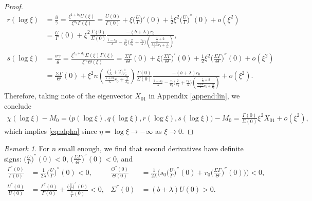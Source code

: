 \documentclass[usletter,11pt]{article}
\def\bg{{\bar{\gamma}}}
\def\bth{{\bar{\theta}}}
\def\bs{{\bar{\sigma}}}
\def\bu{{\bar{u}}}
\theoremstyle{remark}
\newtheorem{remark}{Remark}[section]
\begin{document}
\begin{proof}
\begin{align*}
 r(\log\xi) &= \frac{\bu}{ \bg } = \frac{ \xi^{1+b_1}U(\xi) }{ \xi^{a_1}\Gamma(\xi) } = \frac{ U(0) }{ \Gamma(0) }+ \xi \Big(\frac{U}{\Gamma}\Big)'(0) + \frac{1}{2}\xi^2\Big(\frac{U}{\Gamma}\Big)^{''}(0) + o(\xi^2)\\
  &=\frac{ U }{ \Gamma }(0) + \xi^2\frac{\Gamma(0)}{\Sigma(0)} \frac{-(b+\lambda)r_0}{\frac{1-s_0}{\lambda}-\frac{n}{r_0}\Big(\frac{2}{s_0} + \frac{r_0}{\lambda}\Big)\left(\frac{ \frac{1}{\lambda}+2}{ \frac{1+\alpha}{\lambda}r_0 + \frac{2}{s_0}}\right)} ,
  \\
 s(\log\xi) &= \frac{\bs\bg}{\bth} = \frac{ \xi^{a_1+d_1}\Sigma(\xi)\Gamma(\xi) }{\xi^{c_1} \Theta(\xi)} = \frac{ \Sigma\Gamma }{\Theta}(0) + \xi \Big(\frac{ \Sigma\Gamma }{\Theta}\Big)^{'}(0) + \frac{1}{2}\xi^2\Big(\frac{ \Sigma\Gamma }{\Theta}\Big)^{''}(0) + o(\xi^2)\\
 &=\frac{ \Sigma\Gamma }{\Theta}(0) + \xi^2 n \left(\frac{ \big(\frac{1}{\lambda}+2\big) \frac{1}{r_0} }{ \frac{1+\alpha}{\lambda}r_0 + \frac{2}{s_0}}\right)\frac{\Gamma(0)}{\Sigma(0)} \frac{-(b+\lambda)r_0}{\frac{1-s_0}{\lambda}-\frac{n}{r_0}\Big(\frac{2}{s_0} + \frac{r_0}{\lambda}\Big)\left(\frac{ \frac{1}{\lambda}+2}{ \frac{1+\alpha}{\lambda}r_0 + \frac{2}{s_0}}\right)}+ o(\xi^2).
\end{align*}
Therefore, taking note of the eigenvector $X_{01}$ in Appendix \ref{append:lin}, we conclude
\begin{align*}
\chi(\log\xi)-M_0  = \big(p(\log\xi),q(\log\xi),r(\log\xi),s(\log\xi)\big) -M_0 =  \frac{\Gamma(0)}{\Sigma(0)}\xi^2 X_{01} + o(\xi^2),
\end{align*}
which implies \eqref{eq:alpha} since $\eta=\log\xi \to -\infty$ as $\xi \to 0$.
\end{proof}
\begin{remark} \label{rem:signs}
For $n$ small enough, we find that second derivatives have definite signs: $\displaystyle \Big(\frac{U}{\Gamma}\Big)^{''}(0) <0$, $\displaystyle \Big(\frac{\Sigma\Gamma}{\Theta}\Big)^{''}(0) <0$, and
\begin{equation} \label{eq:second_der}
\begin{aligned}
\frac{\Gamma^{''}(0)}{\Gamma(0)} &= \frac{1}{2\lambda}\Big(\frac{U}{\Gamma}\Big)^{''}(0) < 0, &
\frac{\Theta^{''}(0)}{\Theta(0)} &= \frac{1}{2\lambda}\Big(s_0\Big(\frac{U}{\Gamma}\Big)^{''}(0) + r_0\Big(\frac{\Sigma\Gamma}{\Theta}\Big)^{''}(0)\Big)\Big)  < 0,\\
\frac{U^{''}(0)}{U(0)} &=\frac{\Gamma^{''}(0)}{\Gamma(0)} + \frac{ \big(\frac{U}{\Gamma}\big)^{''}(0)}{\frac{U}{\Gamma}(0)}< 0,&
\Sigma^{''}(0)&=(b+\lambda)U(0)>0.
\end{aligned}
\end{equation}
\end{remark}
\end{document}
